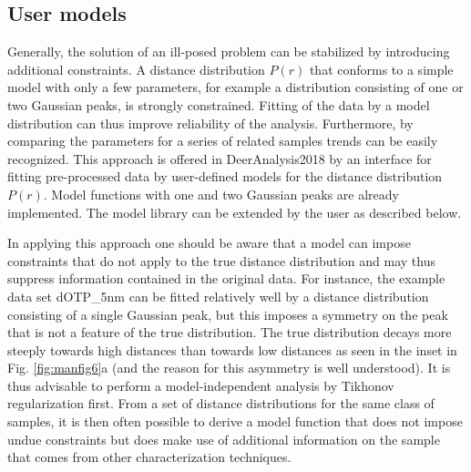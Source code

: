 \documentclass{article}
\begin{document}
\subsection{User models}
Generally, the solution of an ill-posed problem can be stabilized by introducing additional constraints. A distance distribution $P(r)$ that conforms to a simple model with only a few parameters, for example a distribution consisting of one or two Gaussian peaks, is strongly constrained. Fitting of the data by a model distribution can thus improve reliability of the analysis. Furthermore, by comparing the parameters for a series of related samples trends can be easily recognized. This approach is offered in DeerAnalysis2018 by an interface for fitting pre-processed data by user-defined models for the distance distribution $P(r)$. Model functions with one and two Gaussian peaks are already implemented. The model library can be extended by the user as described below.

In applying this approach one should be aware that a model can impose constraints that do not apply to the true distance distribution and may thus suppress information contained in the original data. For instance, the example data set {\ttfamily dOTP\_5nm} can be fitted relatively well by a distance distribution consisting of a single Gaussian peak, but this imposes a symmetry on the peak that is not a feature of the true distribution. The true distribution decays more steeply towards high distances than towards low distances as seen in the inset in Fig. \ref{fig:manfig6}a (and the reason for this asymmetry is well understood). It is thus advisable to perform a model-independent analysis by Tikhonov regularization first. From a set of distance distributions for the same class of samples, it is then often possible to derive a model function that does not impose undue constraints but does make use of additional information on the sample that comes from other characterization techniques.
\end{document}

